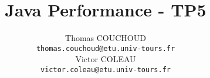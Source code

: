 \documentclass{report}
\title{Java Performance - TP5}
\author{Thomas COUCHOUD\\\texttt{thomas.couchoud@etu.univ-tours.fr}\\Victor COLEAU\\\texttt{victor.coleau@etu.univ-tours.fr}}
\begin{document}
	\mccTitle
	
	
\end{document}
